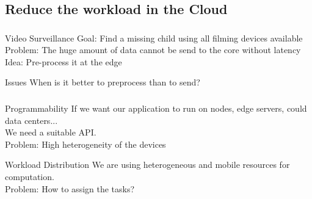 \documentclass[utf8,xcolor=table, page number]{earlywinter}
\begin{document}
\subsection{Reduce the workload in the Cloud}
\begin{frame}
  \frametitle{\secname}
  \framesubtitle{\subsecname}

  \begin{exampleblock}{Video Surveillance}
    Goal: Find a missing child using all filming devices available\\
    Problem: The huge amount of data cannot be send to the core without latency\\
    Idea: Pre-process it at the edge
  \end{exampleblock}
  \vfill
  \begin{alertblock}{Issues}
    When is it better to preprocess than to send?
  \end{alertblock}

\end{frame}

\begin{frame}
  \frametitle{\secname}
  \framesubtitle{\subsecname}
  \begin{alertblock}{Programmability}
    If we want our application to run on nodes, edge servers, could data centers...\\
    We need a suitable API.\\
    Problem: High heterogeneity of the devices
  \end{alertblock}
  \vfill
  \begin{alertblock}{Workload Distribution}
    We are using heterogeneous and mobile resources for computation.\\
    Problem: How to assign the tasks?
  \end{alertblock}
  
\end{frame}
\end{document}
